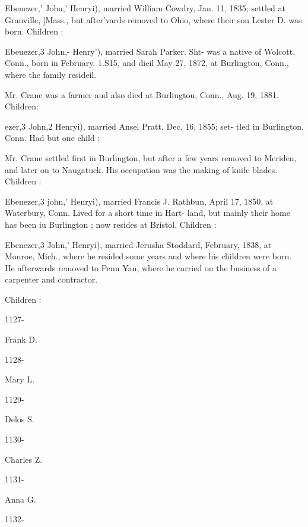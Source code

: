 \documentclass[oneside]{book}
\begin{document}
Ebenezer,' Johu,' Henryi), married William Cowdry, Jan. 11, 
1835; settled at Granville, ]Mass., but after'vards removed to 
Ohio, where their son Lester D. was born. Children : 





Ebeuezer,3 John,- Henry'), married Sarah Parker. Sht- was a 
native of Wolcott, Conn., born in February. 1.S15, and dieil 
May 27, 1872, at Burlington, Conn., where the family resideil. 




Mr. Crane was a farmer aud also died at Burliugtou, Conn., Aug. 
19, 1881. Children: 

ezer,3 John,2 Henryi), married Ansel Pratt, Dec. 16, 1855; set- 
tled in Burlington, Conn. Had but one child : 


Mr. Crane settled first in Burlington, but after a few years 
removed to Meriden, and later on to Naugatuck. His occupation 
was the making of knife blades. Children : 


Ebenezer,3 john,' Henryi), married Francis J. Rathbun, April 
17, 1850, at Waterbury, Conn. Lived for a short time in Hart- 
land, but mainly their home has been iu Burlington ; now resides 
at Bristol. Children : 







Ebenezer,3 John,' Henryi), married Jerusha Stoddard, February, 
1838, at Monroe, Mich., where he resided some years and where 
his children were born. He afterwards removed to Penn Yan, 
where he carried on the business of a carpenter and contractor. 

Children : 



1127- 




Frank D. 


1128- 




Mary L. 


1129- 




Delos S. 


1130- 




Charles Z. 


1131- 




Anna G. 


1132- 
\end{document}
